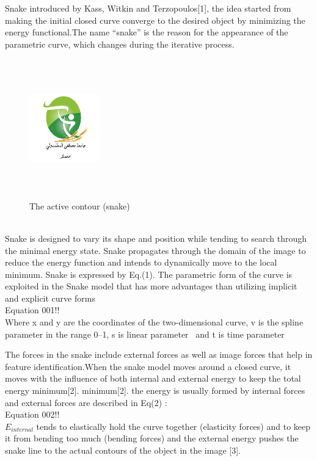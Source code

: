 \hspace{1cm} Snake introduced by Kass, Witkin and Terzopoulos[1], the idea started from
making the initial closed curve converge to the desired object by minimizing
the energy functional.The name “snake” is the reason for the appearance of
the parametric curve, which changes during the iterative process.\\
\begin{figure}[h]
        \centering
        \includegraphics[width=3cm, height=6cm]{figurs/logouniv.jpeg}
        \caption{The active contour (snake)}
        \label{fig:mesh2}

\end{figure}\\
Snake is designed to vary its shape and position while tending to search
through the minimal energy state. Snake propagates through the domain of the
image to reduce the energy function and intends to dynamically move to the
local minimum. Snake is expressed by Eq.(1). The parametric form of the curve
is exploited in the Snake model that has more advantages than utilizing implicit
and explicit curve forms\\
Equation 001!!\\
Where x and y are the coordinates of the two-dimensional curve, v is the spline parameter
in the range 0–1, s is linear parameter \in [ 0\,,1]\, and t is time parameter \in [ 0\,,\propto]\,

\hspace{1cm}The forces in the snake include external forces as well as image forces that help in feature identification.When
the snake model moves around a closed curve, it moves with the influence of both internal and external energy
to keep the total energy minimum[2].
minimum[2].
the energy is usually formed by internal forces and external forces are described in Eq(2) :\\
Equation 002!!\\
$E_{internal}$ tends to elastically hold the curve together (elasticity forces) and to keep it  from bending too much (bending forces) and the external energy  pushes the snake line to the actual contours of the object in the image [3].


